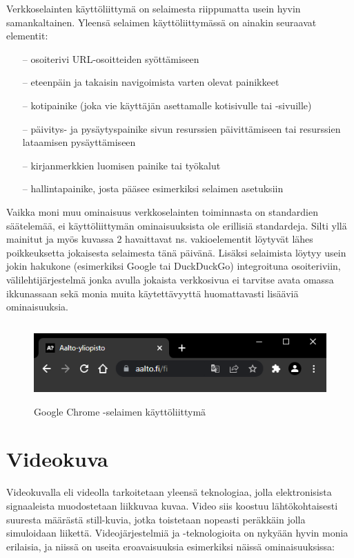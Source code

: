 \documentclass[finnish, 12pt, a4paper, elec, utf8, a-1b, online]{aaltothesis}
\begin{document}
\noindent Verkkoselainten käyttöliittymä on selaimesta riippumatta usein hyvin samankaltainen. Yleensä selaimen käyttöliittymässä on ainakin seuraavat elementit:
\begin{itemize}
  \item[--] osoiterivi URL-osoitteiden syöttämiseen
  \item[--] eteenpäin ja takaisin navigoimista varten olevat painikkeet
  \item[--] kotipainike (joka vie käyttäjän asettamalle kotisivulle tai -sivuille)
  \item[--] päivitys- ja pysäytyspainike sivun resurssien päivittämiseen tai resurssien lataamisen pysäyttämiseen
  \item[--] kirjanmerkkien luomisen painike tai työkalut
  \item[--] hallintapainike, josta pääsee esimerkiksi selaimen asetuksiin
\end{itemize}
Vaikka moni muu ominaisuus verkkoselainten toiminnasta on standardien säätelemää, ei käyttöliittymän ominaisuuksista ole erillisiä standardeja. Silti yllä mainitut ja myös kuvassa 2 havaittavat ns. vakioelementit löytyvät lähes poikkeuksetta jokaisesta selaimesta tänä päivänä. Lisäksi selaimista löytyy usein jokin hakukone (esimerkiksi Google tai DuckDuckGo) integroituna osoiteriviin, välilehtijärjestelmä jonka avulla jokaista verkkosivua ei tarvitse avata omassa ikkunassaan sekä monia muita käytettävyyttä huomattavasti lisääviä ominaisuuksia.

\begin{figure}[htb]
  \centering
  \includegraphics[height=3cm]{./img/browser-ui.png}
  \caption{Google Chrome -selaimen käyttöliittymä \label{kuva2}}
\end{figure}

\clearpage

\section{Videokuva}

Videokuvalla eli videolla tarkoitetaan yleensä teknologiaa, jolla elektronisista signaaleista muodostetaan liikkuvaa kuvaa. Video siis koostuu lähtökohtaisesti suuresta määrästä still-kuvia, jotka toistetaan nopeasti peräkkäin jolla simuloidaan liikettä. Videojärjestelmiä ja -teknologioita on nykyään hyvin monia erilaisia, ja niissä on useita eroavaisuuksia esimerkiksi näissä ominaisuuksissa:
\end{document}

